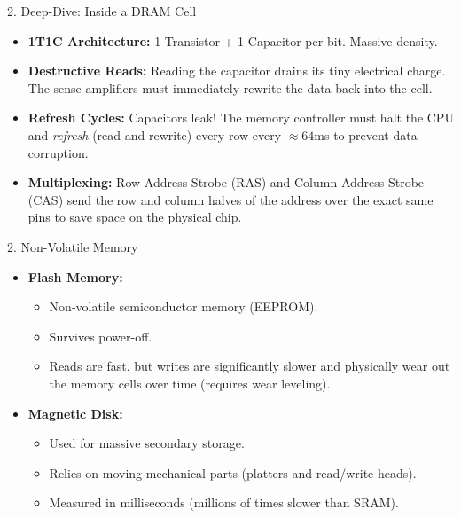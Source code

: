 \documentclass[aspectratio=169]{beamer}
\begin{document}
\begin{frame}{2. Deep-Dive: Inside a DRAM Cell}
\begin{itemize}
    \item \textbf{1T1C Architecture:} 1 Transistor + 1 Capacitor per bit. Massive density.
    \vspace{0.3cm}
    \item \textbf{Destructive Reads:} Reading the capacitor drains its tiny electrical charge. The sense amplifiers must immediately rewrite the data back into the cell.
    \vspace{0.3cm}
    \item \textbf{Refresh Cycles:} Capacitors leak! The memory controller must halt the CPU and \textit{refresh} (read and rewrite) every row every $\approx 64$ms to prevent data corruption.
    \vspace{0.3cm}
    \item \textbf{Multiplexing:} Row Address Strobe (RAS) and Column Address Strobe (CAS) send the row and column halves of the address over the exact same pins to save space on the physical chip.
\end{itemize}
\end{frame}

\begin{frame}{2. Non-Volatile Memory}
\begin{itemize}
    \item \textbf{Flash Memory:}
    \begin{itemize}
        \item Non-volatile semiconductor memory (EEPROM).
        \item Survives power-off.
        \item Reads are fast, but writes are significantly slower and physically wear out the memory cells over time (requires wear leveling).
    \end{itemize}
    \vspace{0.3cm}
    \item \textbf{Magnetic Disk:}
    \begin{itemize}
        \item Used for massive secondary storage.
        \item Relies on moving mechanical parts (platters and read/write heads).
        \item Measured in milliseconds (millions of times slower than SRAM).
    \end{itemize}
\end{itemize}
\end{frame}
\end{document}
